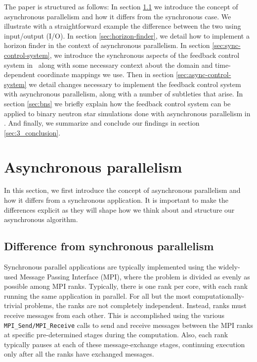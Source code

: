 \begin{bibunit}[unsrtnat]
The paper is structured
as follows: In section \ref{sec:async} we introduce the concept of asynchronous
parallelism and how it differs from the synchronous case. We illustrate with a
straightforward example the difference between the two using input/output (I/O).
In section \ref{sec:horizon-finder}, we detail how to implement a horizon finder
in the context of asynchronous parallelism. In section
\ref{sec:sync-control-system}, we introduce the synchronous aspects of the
feedback control system in \spectre\ along with some necessary context about the
domain and time-dependent coordinate mappings we use. Then in section
\ref{sec:async-control-system} we detail changes necessary to implement the
feedback control system with asynchronous parallelism, along with a number of
subtleties that arise.  In
section \ref{sec:bns} we briefly explain how the
feedback control system can be applied to binary neutron star simulations done
with asynchronous parallelism in \spectre. And finally, we summarize and
conclude our findings  in section \ref{sec:3_conclusion}.

\section{Asynchronous parallelism}
In this section, we first introduce the concept of asynchronous
parallelism and how it differs from a synchronous application. It is important
to make the differences explicit as they will shape how we think about and
structure our asynchronous algorithm.

\subsection{Difference from synchronous parallelism}\label{sec:async}

Synchronous parallel applications are typically implemented using the
widely-used Message Passing Interface (MPI), where the problem is divided as
evenly as possible among MPI ranks. Typically, there is one rank per
core, with each rank running the same application in parallel. For all
but the most computationally-trivial problems, the ranks are not completely
independent. Instead, ranks must receive messages from each other. This is
accomplished using the various \texttt{MPI\_Send/MPI\_Receive} calls to send and
receive messages between the MPI ranks at specific pre-determined stages during
the computation. Also, each rank typically pauses at each of these
message-exchange stages, continuing execution only after all the ranks have
exchanged messages.


\end{bibunit}

